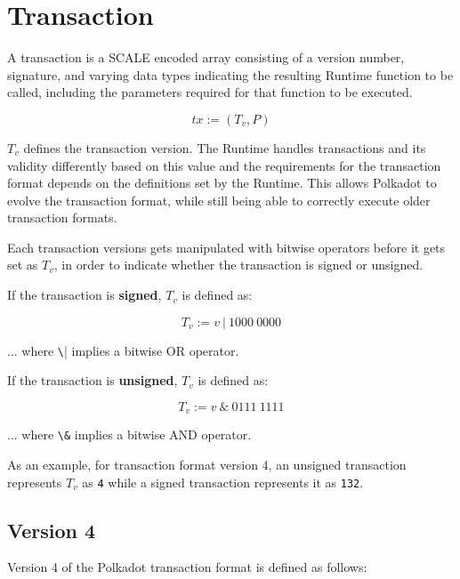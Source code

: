 \newpage
\section{Transaction}

A transaction is a SCALE encoded array consisting of a version number,
signature, and varying data types indicating the resulting Runtime function to
be called, including the parameters required for that function to be executed.
\newline

\[
    tx := (T_v, P)
\]

$T_v$ defines the transaction version. The Runtime handles transactions and its
validity differently based on this value and the requirements for the
transaction format depends on the definitions set by the Runtime. This allows
Polkadot to evolve the transaction format, while still being able to correctly
execute older transaction formats.
\newline

Each transaction versions gets manipulated with bitwise operators before it gets
set as $T_v$, in order to indicate whether the transaction is signed or
unsigned.
\newline

If the transaction is \textbf{signed}, $T_v$ is defined as:

\[
    T_v := v \ | \ 1000 \ 0000
\]

... where \verb|\|| implies a bitwise OR operator.
\newline

If the transaction is \textbf{unsigned}, $T_v$ is defined as:

\[
    T_v :=v \ \& \ 0111 \ 1111
\]

... where \verb|\&| implies a bitwise AND operator.
\newline

As an example, for transaction format version 4, an unsigned transaction
represents $T_v$ as \verb|4| while a signed transaction represents it as
\verb|132|.
\newline


\subsection{Version 4}

Version 4 of the Polkadot transaction format is defined as follows:

